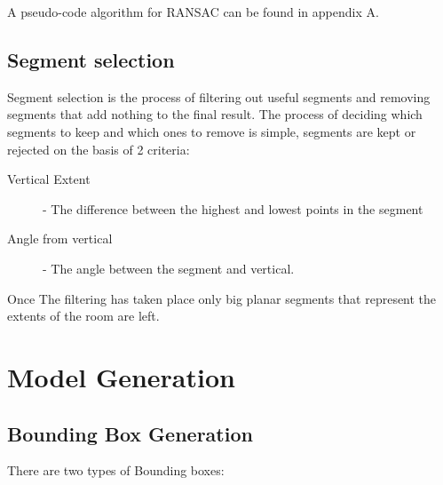				
				A pseudo-code algorithm for RANSAC can be found in appendix A.
		\subsection{Segment selection}
			Segment selection is the process of filtering out useful segments and removing segments that add nothing to the final result. The process of deciding which segments to keep and which ones to remove is simple, segments are kept or rejected on the basis of 2 criteria:
			
			\begin{description}
				\item[Vertical Extent] - The  difference between the highest and lowest points in the segment
				\item[Angle from vertical] - The angle between the segment and vertical.
			\end{description}
			
			Once The filtering has taken place only big planar segments that represent the extents of the room are left.
			
		
\newpage
\section{Model Generation}
	\subsection{Bounding Box Generation}
		There are two types of Bounding boxes:
		
